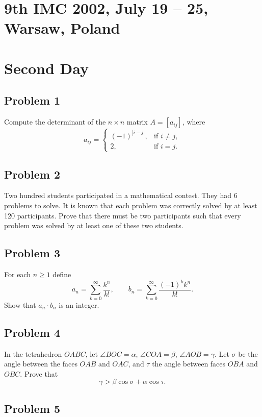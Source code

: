 \documentclass{article}
\begin{document}
\pagestyle{plain}

\section*{9th IMC 2002, July 19 -- 25, Warsaw, Poland}

\section*{Second Day}

\subsection*{Problem 1}
Compute the determinant of the $n \times n$ matrix $A = [a_{ij}]$, where
\[
a_{ij} =
    \begin{cases}
        (-1)^{|i-j|}, & \text{if } i \ne j, \\
        2, & \text{if } i = j.
    \end{cases}
\]

\subsection*{Problem 2}

Two hundred students participated in a mathematical contest.
They had 6 problems to solve. It is known that each problem was correctly solved by at least 120 participants.
Prove that there must be two participants such that every problem was solved by
at least one of these two students.

\subsection*{Problem 3}

For each $n \ge 1$ define
\[
    a_n = \sum_{k=0}^\infty \frac{k^n}{k!}, \qquad
    b_n = \sum_{k=0}^\infty \frac{(-1)^k k^n}{k!}.
\]
Show that $a_n \cdot b_n$ is an integer.


\subsection*{Problem 4}
In the tetrahedron $OABC$, let $\angle BOC = \alpha$, $\angle COA = \beta$, $\angle AOB = \gamma$.
Let $\sigma$ be the angle between the faces $OAB$ and $OAC$,
and $\tau$ the angle between faces $OBA$ and $OBC$. Prove that
\[
    \gamma > \beta \cos \sigma + \alpha \cos \tau.
\]

\subsection*{Problem 5}
\end{document}
